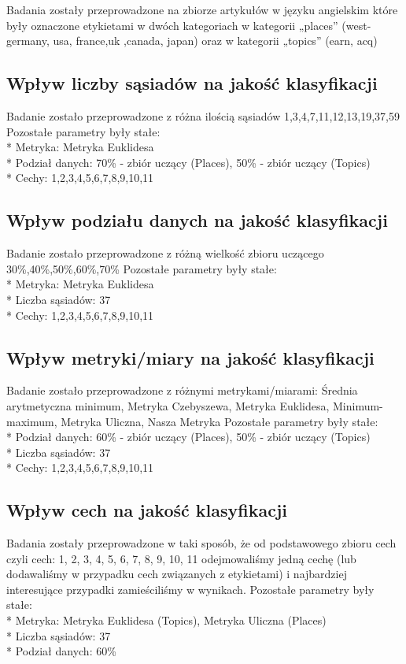 \documentclass{classrep}
\begin{document}
{
Badania zostały przeprowadzone na zbiorze artykułów w języku angielskim które były oznaczone etykietami w dwóch kategoriach w kategorii „places” (west-germany, usa, france,uk ,canada, japan) oraz w kategorii „topics” (earn, acq) 

\subsection{Wpływ liczby sąsiadów na jakość klasyfikacji}
Badanie zostało przeprowadzone z różna ilością sąsiadów {1,3,4,7,11,12,13,19,37,59}
Pozostałe parametry były stałe:
\\*
Metryka: Metryka Euklidesa
\\*
Podział danych: 70\% - zbiór uczący (Places), 50\% - zbiór uczący (Topics)
\\*
Cechy: 1,2,3,4,5,6,7,8,9,10,11
\subsection{Wpływ podziału danych na jakość klasyfikacji}
Badanie zostało przeprowadzone z różną wielkość zbioru uczącego {30\%,40\%,50\%,60\%,70\%}
Pozostałe parametry były stałe:
\\*
Metryka: Metryka Euklidesa
\\*
Liczba sąsiadów: 37
\\*
Cechy: 1,2,3,4,5,6,7,8,9,10,11
\subsection{Wpływ metryki/miary na jakość klasyfikacji}
Badanie zostało przeprowadzone z różnymi metrykami/miarami: {Średnia arytmetyczna minimum, Metryka Czebyszewa, Metryka Euklidesa, Minimum-maximum, Metryka Uliczna, Nasza Metryka}
Pozostałe parametry były stałe:
\\*
Podział danych: 60\% - zbiór uczący (Places), 50\% - zbiór uczący (Topics)
\\*
Liczba sąsiadów: 37
\\*
Cechy: 1,2,3,4,5,6,7,8,9,10,11
\subsection{Wpływ cech na jakość klasyfikacji}
Badania zostały przeprowadzone w taki sposób, że od podstawowego zbioru cech czyli cech: 1, 2, 3, 4, 5, 6, 7, 8, 9, 10, 11 odejmowaliśmy jedną cechę (lub dodawaliśmy w przypadku cech związanych z etykietami) i najbardziej interesujące przypadki zamieściliśmy w wynikach. 
Pozostałe parametry były stałe:
\\*
Metryka: Metryka Euklidesa (Topics), Metryka Uliczna (Places)
\\*
Liczba sąsiadów: 37
\\*
Podział danych: 60\%
}
\end{document}
